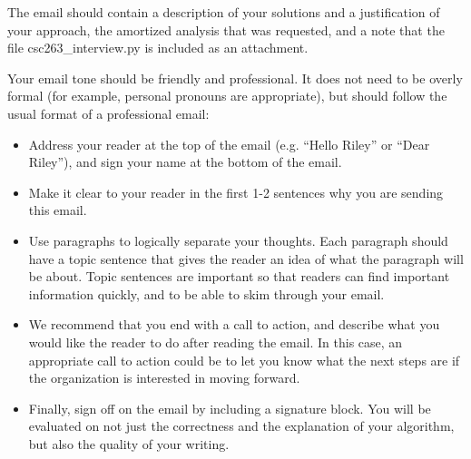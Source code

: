 \documentclass{article}
\begin{document}
The email should contain a description of your solutions and a justification of your approach, the amortized analysis that
was requested, and a note that the file csc263\_interview.py is included as an attachment.

Your email tone should be friendly and professional. It does not need to be overly formal (for example, personal pronouns
are appropriate), but should follow the usual format of a professional email:
\begin{itemize}
	\item Address your reader at the top of the email (e.g. “Hello Riley” or “Dear Riley”), and sign your name at the bottom of
the email.
	\item Make it clear to your reader in the first 1-2 sentences why you are sending this email.
	\item Use paragraphs to logically separate your thoughts. Each paragraph should have a topic sentence that gives the reader an
idea of what the paragraph will be about. Topic sentences are important so that readers can find important information
quickly, and to be able to skim through your email.
	\item We recommend that you end with a call to action, and describe what you would like the reader to do after reading the
email. In this case, an appropriate call to action could be to let you know what the next steps are if the organization
is interested in moving forward.
	\item Finally, sign off on the email by including a signature block.
You will be evaluated on not just the correctness and the explanation of your algorithm, but also the quality of your writing.
\end{itemize}
\end{document}
